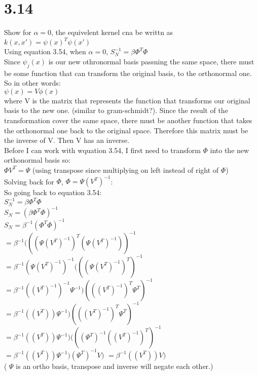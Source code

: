 \documentclass[11pt,leqno,fleqn]{article}
\begin{document}
\newpage
\section{3.14}
Show for $\alpha = 0$, the equivelent kernel cna be writtn as $k(x,x') = \psi (x)^T \psi(x')$\\
Using equation 3.54, when $\alpha = 0$, $S_N^{-1} = \beta \Phi^T \Phi$\\
Since $\psi_j(x)$ is our new othronormal basis passning the same space, there must be some function that can transform the original basis,
to the orthonormal one. So in other words:\\
$\psi (x) = V \phi(x)$\\
 where V is the matrix that represents the function that transforms our original basis to the new one. (similar to gram-schmidt?). Since the result of the transformation cover the same space,  there must be another function that takes the orthonormal one back to the original space. Therefore this matrix must be the inverse of V. Then V has an inverse.\\
Before I can work with wquation 3.54, I first need to transform $\Phi $ into the new orthonormal basis so:\\
$\Phi V^T = \Psi$ (using transpose since multiplying on left instead of right of $\Phi$)\\
Solving back for $\Phi$, $\Phi = \Psi (V^T)^{-1}$:\\
So going back to equation 3.54:\\
$S_N^{-1} = \beta \Phi^T \Phi $\\
$S_N = (\beta \Phi^T \Phi)^{-1} $\\
$S_N = \beta^{-1}( \Phi^T \Phi)^{-1} $\\
$= \beta^{-1} (((\Psi (V^T)^{-1})^T (\Psi (V^T)^{-1}))^{-1}$\\
$= \beta^{-1}  (\Psi (V^T)^{-1})^{-1} (((\Psi (V^T)^{-1})^T)^{-1}  $ \\
$= \beta^{-1}  ( (V^T)^{-1})^{-1} \Psi^{-1}) (( (V^T)^{-1})^T \Psi ^T)^{-1}  $ \\
$= \beta^{-1}  ( (V^T)) \Psi^{-1}) (( (V^T)^{-1})^T \Psi ^T)^{-1}  $ \\
$= \beta^{-1}  ( (V^T)) \Psi^{-1}) (( (\Psi ^T)^{-1} ((V^T)^{-1})^T )^{-1}  $ \\
$= \beta^{-1}  ( (V^T)) \Psi^{-1})  (\Psi ^T)^{-1} V)$ 
$= \beta^{-1}  ( (V^T))  V)$
\\ ( $\Psi$ is an ortho basis, transpose and inverse will negate each other.)\\
\end{document}
